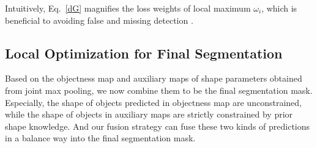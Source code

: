 Intuitively, Eq.~\ref{dG} magnifies the loss weights of local maximum $\omega_{i}$, which is beneficial to avoiding false and missing detection .

\subsection{Local Optimization for Final Segmentation}
\label{sec:fusion}
Based on the objectness map and auxiliary maps of shape parameters obtained from joint max pooling, we now combine them to be the final segmentation mask.
Especially, the shape of objects predicted in objectness map are unconstrained, while the shape of objects in auxiliary maps are strictly constrained by prior shape knowledge.
And our fusion strategy can fuse these two kinds of predictions in a balance way into the final segmentation mask.

